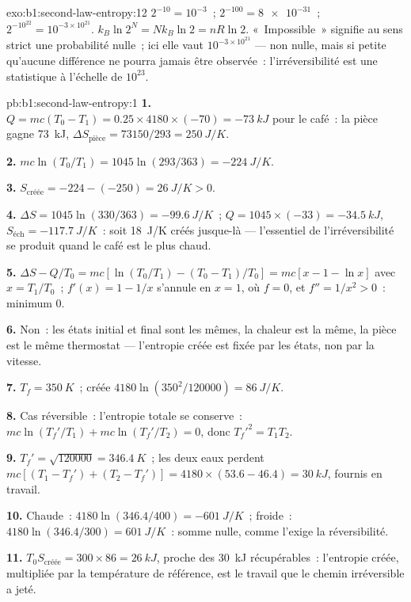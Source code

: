 \begin{solution}{exo:b1:second-law-entropy:12}
$2^{-10} = 10^{-3}$~; $2^{-100} = \num{8e-31}$~; $2^{-10^{22}} = 10^{-3\times10^{21}}$.
$k_B\ln2^N = Nk_B\ln2 = nR\ln2$. «~Impossible~» signifie au sens strict une
probabilité nulle~; ici elle vaut $10^{-3\times10^{21}}$ --- non nulle, mais si
petite qu'aucune différence ne pourra jamais être observée~: l'irréversibilité
est une statistique à l'échelle de $10^{23}$.
\end{solution}

\begin{solution}{pb:b1:second-law-entropy:1}
\textbf{1.} $Q = mc(T_0 - T_1) = 0.25 \times 4180 \times (-70) = \qty{-73}{kJ}$
pour le café~: la pièce gagne \qty{73}{kJ}, $\Delta S_{\text{pièce}} = 73150/293
= \qty{+250}{J/K}$.

\textbf{2.} $mc\ln(T_0/T_1) = 1045\ln(293/363) = \qty{-224}{J/K}$.

\textbf{3.} $S_{\text{créée}} = -224 - (-250) = \qty{+26}{J/K} > 0$.

\textbf{4.} $\Delta S = 1045\ln(330/363) = \qty{-99.6}{J/K}$~; $Q = 1045 \times
(-33) = \qty{-34.5}{kJ}$, $S_{\text{éch}} = \qty{-117.7}{J/K}$~: soit
\qty{18}{J/K} créés jusque-là --- l'essentiel de l'irréversibilité se produit
quand le café est le plus chaud.

\textbf{5.} $\Delta S - Q/T_0 = mc[\ln(T_0/T_1) - (T_0 - T_1)/T_0] = mc[x - 1 -
\ln x]$ avec $x = T_1/T_0$~; $f'(x) = 1 - 1/x$ s'annule en $x = 1$, où
$f = 0$, et $f'' = 1/x^2 > 0$~: minimum $0$.

\textbf{6.} Non~: les états initial et final sont les mêmes, la chaleur est la
même, la pièce est le même thermostat --- l'entropie créée est fixée par les
états, non par la vitesse.

\textbf{7.} $T_f = \qty{350}{K}$~; créée $4180\ln(350^2/120000) = \qty{86}{J/K}$.

\textbf{8.} Cas réversible~: l'entropie totale se conserve~: $mc\ln(T_f'/T_1) + mc\ln(T_f'/
T_2) = 0$, donc $T_f'^2 = T_1T_2$.

\textbf{9.} $T_f' = \sqrt{120000} = \qty{346.4}{K}$~; les deux eaux perdent $mc[(T_1 -
T_f') + (T_2 - T_f')] = 4180 \times (53.6 - 46.4) = \qty{30}{kJ}$, fournis en
travail.

\textbf{10.} Chaude~: $4180\ln(346.4/400) = \qty{-601}{J/K}$~; froide~: $4180\ln(346.4/
300) = \qty{+601}{J/K}$~: somme nulle, comme l'exige la réversibilité.

\textbf{11.} $T_0S_{\text{créée}} = 300 \times 86 = \qty{26}{kJ}$, proche des
\qty{30}{kJ} récupérables~: l'entropie créée, multipliée par la température de
référence, est le travail que le chemin irréversible a jeté.


\end{solution}
